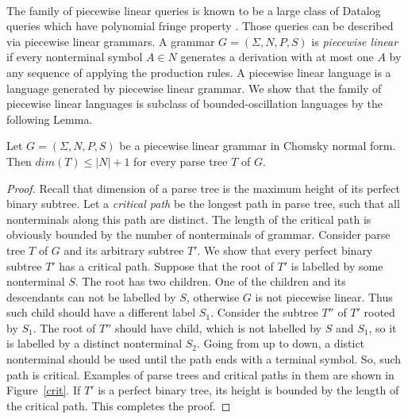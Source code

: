 \begin{example}
\\
The family of piecewise linear queries is known to be a large class of Datalog queries which have polynomial fringe property \cite{Ullman}. Those queries can be described via piecewise linear grammars. A grammar $G = (\Sigma, N, P, S)$ is \textit{piecewise linear} if every nonterminal symbol $A \in N$ generates a derivation with at most one $A$ by any sequence of applying the production rules. A piecewise linear language is a language generated by piecewise linear grammar. We show that the family of piecewise linear languages is subclass of bounded-oscillation languages by the following Lemma.
\begin{lemma}
Let  $G = (\Sigma, N, P, S)$ be a piecewise linear grammar in Chomsky normal form. Then $dim(T) \le |N| + 1$ for every parse tree $T$ of $G$.
\end{lemma}
\begin{proof} Recall that dimension of a parse tree is the maximum height of its perfect binary subtree. Let a \textit{critical path} be the longest path in parse tree, such that all nonterminals along this path are distinct. The length of the critical path is obviously bounded by the number of nonterminals of grammar.  Consider parse tree $T$ of $G$ and its arbitrary subtree $T'$. We show that every perfect binary subtree $T'$ has a critical path. Suppose that the root of $T'$ is labelled by some nonterminal $S$. The root has two children. One of the children and its descendants can not be labelled by $S$, otherwise $G$ is not piecewise linear. Thus such child should have a different label $S_1$. Consider the subtree $T''$ of $T'$ rooted by $S_1$. The root of $T''$ should have child, which is not labelled by $S$ and $S_1$, so it is labelled by a distinct nonterminal $S_2$. Going from up to down, a distict nonterminal should be used until the path ends with a terminal symbol. So, such path is critical. Examples of parse trees and critical paths in them are shown in Figure~\ref{crit}. If $T'$ is a perfect binary tree, its height is bounded by the length of the critical path. This completes the proof.
\end{proof}


\end{example}

